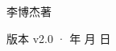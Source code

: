 \begin{titlepage}
\vfill
{\LARGE\sffamily 李博杰\quad 著\par}
\vspace{0.7cm}
{\small\sffamily\color{structurecolor!80} 版本 v2.0 · \number\year 年 \number\month 月 \number\day 日\par}
\vspace{1.2cm}
\end{titlepage}
